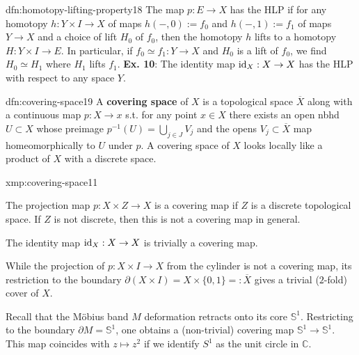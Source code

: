 \documentclass[landscape, 8pt]{extarticle}
\begin{document}
\begin{multicols*}{3}
\begin{dfn}{dfn:homotopy-lifting-property}{18}
	\tcbline
	The map $p : E \to X$ has the HLP if for any homotopy $h : Y \times I \to X$ of maps $h(-, 0) := f_{0}$ and $h(-, 1) := f_{1}$ of maps $Y \to X$ and a choice of lift $H_{0}$ of $f_{0}$, then the homotopy $h$ lifts to a homotopy $H : Y \times I \to E$. In particular, if $f_{0} \simeq f_{1} : Y \to X$ and $H_{0}$ is a lift of $f_{0}$, we find $H_{0} \simeq H_{1}$ where $H_{1}$ lifts $f_{1}$.
	\tcbline
	\textbf{Ex. 10}: The identity map $\operatorname{id}_{X} : X \to X$ has the HLP with respect to any space $Y$.
\end{dfn}

\vspace{-7pt}
\begin{dfn}{dfn:covering-space}{19}
	\vspace{-2pt}
	A \textbf{covering space} of $X$ is a topological space $\overline{X}$ along with a continuous map $p : X \to x$ s.t. for any point $x\in X$ there exists an open nbhd $U \subset X$ whose preimage $p^{-1}(U) = \bigcup_{j\in J} V_{j}$ and the opens $V_{j} \subset \overline{X}$ map homeomorphically to $U$ under $p$. A covering space of $X$ looks locally like a product of $X$ with a discrete space.
\end{dfn}

\vspace{-7pt}
\begin{xmp}{xmp:covering-space}{11}
	\vspace{-2pt}
	\begin{enumerate-zero}
	    \item The projection map $p : X \times Z \to X$ is a covering map if $Z$ is a discrete topological space. If $Z$ is not discrete, then this is not a covering map in general.
	    \item The identity map $\operatorname{id}_{X} : X \to X$ is trivially a covering map.
	    \item While the projection of $p : X \times I \to X$ from the cylinder is not a covering map, its restriction to the boundary $\partial(X \times I ) = X \times \{0, 1\} =: \overline{X}$ gives a trivial ($2$-fold) cover of $X$.
	    \item Recall that the M\"obius band $M$ deformation retracts onto its core $\mathbb{S}^{1}$. Restricting to the boundary $\partial M = \mathbb{S}^{1}$, one obtains a (non-trivial) covering map $\mathbb{S}^{1}\to \mathbb{S}^{1}$. This map coincides with $z \mapsto z^{2}$ if we identify $S^{1}$ as the unit circle in $\mathbb{C}$.
	\end{enumerate-zero}
\end{xmp}


\end{multicols*}
\end{document}
